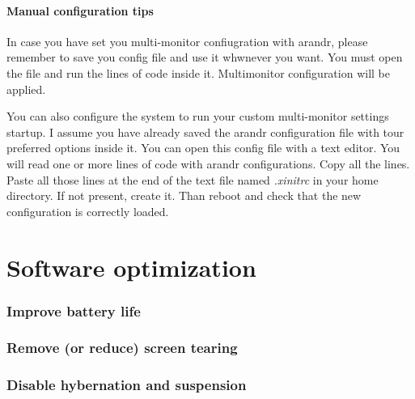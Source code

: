 \documentclass{article}
\begin{document}
\paragraph{Manual configuration tips}

In case you have set you multi-monitor confiugration with arandr, please remember to save you config file and use it whwnever you want. You must open the file and run the lines of code inside it. Multimonitor configuration will be applied.

You can also configure the system to run your custom multi-monitor settings startup. I assume you have already saved the arandr configuration file with tour preferred options inside it. You can open this config file with a text editor. You will read one or more lines of code with arandr configurations. Copy all the lines. Paste all those lines at the end of the text file named \emph{.xinitrc} in your home directory. If not present, create it. Than reboot and check that the new configuration is correctly loaded. 
 

\section{Software optimization}

\subsubsection{Improve battery life}

\subsubsection{Remove (or reduce) screen tearing}

\subsubsection{Disable hybernation and suspension}
\end{document}
